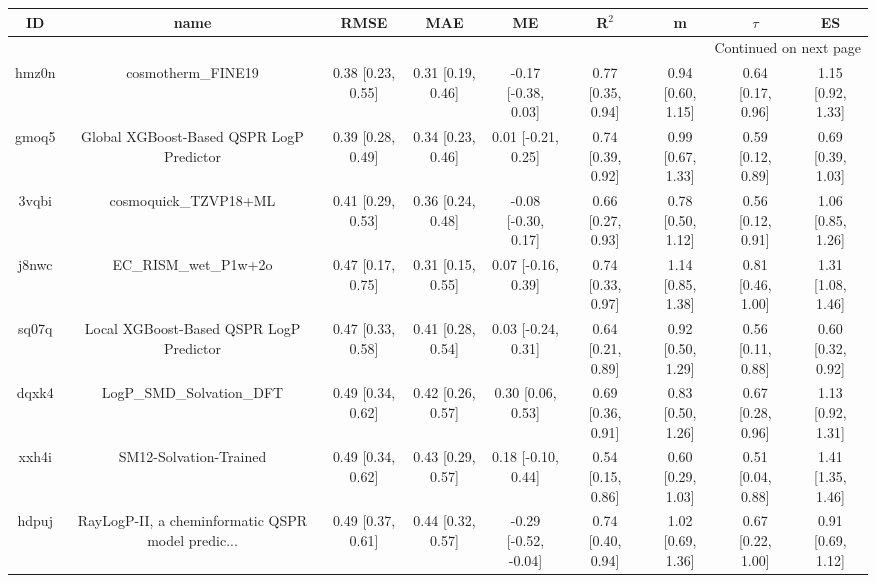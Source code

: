 \documentclass{article}
\begin{document}
\begin{center}
\scriptsize
\begin{longtable}{|ccccccccc|}
\toprule
    ID &                                               name &               RMSE &                MAE &                    ME &              R$^2$ &                    m &               $\tau$ &                    ES \\
\midrule
\endhead
\midrule
\multicolumn{9}{r}{{Continued on next page}} \\
\midrule
\endfoot

\bottomrule
\endlastfoot
 hmz0n &                                 cosmotherm\_FINE19 &  0.38 [0.23, 0.55] &  0.31 [0.19, 0.46] &   -0.17 [-0.38, 0.03] &  0.77 [0.35, 0.94] &    0.94 [0.60, 1.15] &    0.64 [0.17, 0.96] &     1.15 [0.92, 1.33] \\
 gmoq5 &           Global XGBoost-Based QSPR LogP Predictor &  0.39 [0.28, 0.49] &  0.34 [0.23, 0.46] &    0.01 [-0.21, 0.25] &  0.74 [0.39, 0.92] &    0.99 [0.67, 1.33] &    0.59 [0.12, 0.89] &     0.69 [0.39, 1.03] \\
 3vqbi &                              cosmoquick\_TZVP18+ML &  0.41 [0.29, 0.53] &  0.36 [0.24, 0.48] &   -0.08 [-0.30, 0.17] &  0.66 [0.27, 0.93] &    0.78 [0.50, 1.12] &    0.56 [0.12, 0.91] &     1.06 [0.85, 1.26] \\
 j8nwc &                              EC\_RISM\_wet\_P1w+2o &  0.47 [0.17, 0.75] &  0.31 [0.15, 0.55] &    0.07 [-0.16, 0.39] &  0.74 [0.33, 0.97] &    1.14 [0.85, 1.38] &    0.81 [0.46, 1.00] &     1.31 [1.08, 1.46] \\
 sq07q &            Local XGBoost-Based QSPR LogP Predictor &  0.47 [0.33, 0.58] &  0.41 [0.28, 0.54] &    0.03 [-0.24, 0.31] &  0.64 [0.21, 0.89] &    0.92 [0.50, 1.29] &    0.56 [0.11, 0.88] &     0.60 [0.32, 0.92] \\
 dqxk4 &                          LogP\_SMD\_Solvation\_DFT &  0.49 [0.34, 0.62] &  0.42 [0.26, 0.57] &     0.30 [0.06, 0.53] &  0.69 [0.36, 0.91] &    0.83 [0.50, 1.26] &    0.67 [0.28, 0.96] &     1.13 [0.92, 1.31] \\
 xxh4i &                             SM12-Solvation-Trained &  0.49 [0.34, 0.62] &  0.43 [0.29, 0.57] &    0.18 [-0.10, 0.44] &  0.54 [0.15, 0.86] &    0.60 [0.29, 1.03] &    0.51 [0.04, 0.88] &     1.41 [1.35, 1.46] \\
 hdpuj &  RayLogP-II, a cheminformatic QSPR model predic... &  0.49 [0.37, 0.61] &  0.44 [0.32, 0.57] &  -0.29 [-0.52, -0.04] &  0.74 [0.40, 0.94] &    1.02 [0.69, 1.36] &    0.67 [0.22, 1.00] &     0.91 [0.69, 1.12] \\

\end{longtable}
\end{center}
\end{document}
